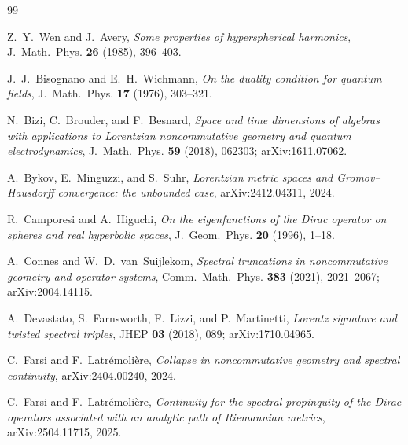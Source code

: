 \documentclass[11pt,a4paper]{article}
\theoremstyle{plain}
\theoremstyle{definition}
\begin{document}

\begin{thebibliography}{99}

Z.~Y.~Wen and J.~Avery,
\newblock \emph{Some properties of hyperspherical harmonics},
\newblock J.~Math.~Phys. \textbf{26} (1985), 396--403.

J.~J.~Bisognano and E.~H.~Wichmann,
\newblock \emph{On the duality condition for quantum fields},
\newblock J.~Math.~Phys. \textbf{17} (1976), 303--321.

N.~Bizi, C.~Brouder, and F.~Besnard,
\newblock \emph{Space and time dimensions of algebras with
applications to Lorentzian noncommutative geometry and quantum
electrodynamics},
\newblock J.~Math.~Phys. \textbf{59} (2018), 062303;
\newblock arXiv:1611.07062.

A.~Bykov, E.~Minguzzi, and S.~Suhr,
\newblock \emph{Lorentzian metric spaces and Gromov--Hausdorff convergence: the unbounded case},
\newblock arXiv:2412.04311, 2024.

R.~Camporesi and A.~Higuchi,
\newblock \emph{On the eigenfunctions of the Dirac operator on
spheres and real hyperbolic spaces},
\newblock J.~Geom.~Phys. \textbf{20} (1996), 1--18.

A.~Connes and W.~D.~van~Suijlekom,
\newblock \emph{Spectral truncations in noncommutative geometry and
operator systems},
\newblock Comm.~Math.~Phys. \textbf{383} (2021), 2021--2067;
\newblock arXiv:2004.14115.

A.~Devastato, S.~Farnsworth, F.~Lizzi, and P.~Martinetti,
\newblock \emph{Lorentz signature and twisted spectral triples},
\newblock JHEP \textbf{03} (2018), 089; arXiv:1710.04965.

C.~Farsi and F.~Latr\'emoli\`ere,
\newblock \emph{Collapse in noncommutative geometry and spectral
continuity},
\newblock arXiv:2404.00240, 2024.

C.~Farsi and F.~Latr\'emoli\`ere,
\newblock \emph{Continuity for the spectral propinquity of the
Dirac operators associated with an analytic path of Riemannian
metrics},
\newblock arXiv:2504.11715, 2025.


\end{thebibliography}
\end{document}
